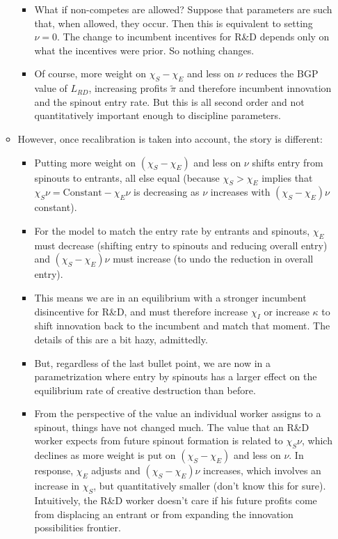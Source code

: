 \documentclass[12pt,english]{article}
\theoremstyle{remark}
\begin{document}
\begin{enumerate}
\begin{itemize}
\begin{itemize}
			\item What if non-competes are allowed? Suppose that parameters are such that, when allowed, they occur. Then this is equivalent to setting $\nu = 0$. The change to incumbent incentives for R\&D depends only on what the incentives were prior. So nothing changes.
			\item Of course, more weight on $\chi_S - \chi_E$ and less on $\nu$ reduces the BGP value of $L_{RD}$, increasing profits $\tilde{\pi}$ and therefore incumbent innovation and the spinout entry rate. But this is all second order and not quantitatively important enough to discipline parameters.
		\end{itemize}
		\item However, once recalibration is taken into account, the story is different:
		\begin{itemize}
			\item Putting more weight on $(\chi_S -\chi_E)$ and less on $\nu$ shifts entry from spinouts to entrants, all else equal (because $\chi_S > \chi_E$ implies that $\chi_S \nu = \textrm{Constant} - \chi_E\nu$ is decreasing as $\nu$ increases with $(\chi_S - \chi_E)\nu$ constant). 
			\item For the model to match the entry rate by entrants and spinouts, $\chi_E$ must decrease (shifting entry to spinouts and reducing overall entry) and $(\chi_S - \chi_E) \nu$ must increase (to undo the reduction in overall entry). 
			\item This means we are in an equilibrium with a stronger incumbent disincentive for R\&D, and must therefore increase $\chi_I$ or increase $\kappa$ to shift innovation back to the incumbent and match that moment. The details of this are a bit hazy, admittedly.
			\item But, regardless of the last bullet point, we are now in a parametrization where entry by spinouts has a larger effect on the equilibrium rate of creative destruction than before.
			\item From the perspective of the value an individual worker assigns to a spinout, things have not changed much. The value that an R\&D worker expects from future spinout formation is related to $\chi_S \nu$, which declines as more weight is put on $(\chi_S -\chi_E)$ and less on $\nu$. In response, $\chi_E$ adjusts and $(\chi_S- \chi_E) \nu$ increases, which involves an increase in $\chi_S$, but quantitatively smaller (don't know this for sure). Intuitively, the R\&D worker doesn't care if his future profits come from displacing an entrant or from expanding the innovation possibilities frontier.

\end{itemize}
\end{itemize}
\end{enumerate}
\end{document}
